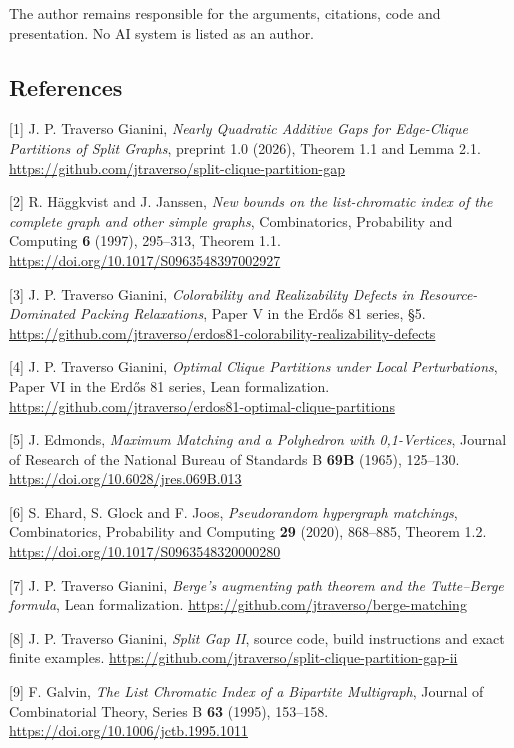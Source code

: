 \documentclass[english,11pt,a4paper]{article}
\begin{document}
The author remains responsible for the arguments, citations, code and presentation. No AI system is listed as an author.

\subsection{References}\label{references}

{[}1{]} J. P. Traverso Gianini, \emph{Nearly Quadratic Additive Gaps for Edge-Clique Partitions of Split Graphs}, preprint 1.0 (2026), Theorem 1.1 and Lemma 2.1. \url{https://github.com/jtraverso/split-clique-partition-gap}

{[}2{]} R. Häggkvist and J. Janssen, \emph{New bounds on the list-chromatic index of the complete graph and other simple graphs}, Combinatorics, Probability and Computing \textbf{6} (1997), 295--313, Theorem 1.1. \url{https://doi.org/10.1017/S0963548397002927}

{[}3{]} J. P. Traverso Gianini, \emph{Colorability and Realizability Defects in Resource-Dominated Packing Relaxations}, Paper V in the Erdős 81 series, §5. \url{https://github.com/jtraverso/erdos81-colorability-realizability-defects}

{[}4{]} J. P. Traverso Gianini, \emph{Optimal Clique Partitions under Local Perturbations}, Paper VI in the Erdős 81 series, Lean formalization. \url{https://github.com/jtraverso/erdos81-optimal-clique-partitions}

{[}5{]} J. Edmonds, \emph{Maximum Matching and a Polyhedron with 0,1-Vertices}, Journal of Research of the National Bureau of Standards B \textbf{69B} (1965), 125--130. \url{https://doi.org/10.6028/jres.069B.013}

{[}6{]} S. Ehard, S. Glock and F. Joos, \emph{Pseudorandom hypergraph matchings}, Combinatorics, Probability and Computing \textbf{29} (2020), 868--885, Theorem 1.2. \url{https://doi.org/10.1017/S0963548320000280}

{[}7{]} J. P. Traverso Gianini, \emph{Berge's augmenting path theorem and the Tutte--Berge formula}, Lean formalization. \url{https://github.com/jtraverso/berge-matching}

{[}8{]} J. P. Traverso Gianini, \emph{Split Gap II}, source code, build instructions and exact finite examples. \url{https://github.com/jtraverso/split-clique-partition-gap-ii}

{[}9{]} F. Galvin, \emph{The List Chromatic Index of a Bipartite Multigraph}, Journal of Combinatorial Theory, Series B \textbf{63} (1995), 153--158. \url{https://doi.org/10.1006/jctb.1995.1011}
\end{document}
